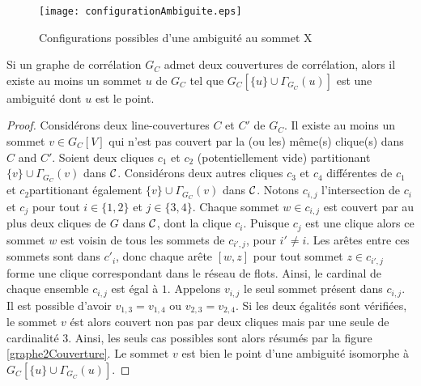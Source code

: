 	\begin{centering}\vspace{-0.5em}
	\begin{figure}[htb!]\vspace{-0.5em}
	\texttt{[image: configurationAmbiguite.eps]}\vspace{-0.5em}
	\caption{ Configurations possibles d'une ambiguit\'e au sommet X }\vspace{-0.5em}
	\label{configurationAmbiguite}
	\end{figure}
	\end{centering}
	
	\begin{lemma}
	Si un graphe de corr\'elation $G_C$ admet deux couvertures de corr\'elation, alors il existe au moins un sommet $u$ de $G_C$ tel que $G_{C}[\{u\} \cup \Gamma_{G_C}(u)]$ est une ambiguit\'e dont $u$ est le point.
	\end{lemma}
	
	\begin{proof} 
		Consid\'erons deux line-couvertures $C$ et $C'$ de $G_C$. 
		Il existe au moins un sommet $v \in G_C[V]$ qui n'est pas couvert par la (ou les) m\^eme(s) clique(s) dans $C$ and $C'$.
		Soient deux cliques $c_1$ et $c_2$ (potentiellement vide) partitionant $\{v\} \cup \Gamma_{G_C}(v)$ dans $\cal C$.
		Consid\'erons deux autres cliques $c_3$ et $c_4$ diff\'erentes de $c_1$ et $c_2$partitionant \'egalement $\{v\} \cup \Gamma_{G_C}(v)$ dans $\cal C$. \newline
		Notons $c_{i,j}$ l'intersection de $c_{i}$ et $c_j$ pour tout $i \in \{1,2\}$ et $j \in \{3,4\}$. 
		Chaque sommet $w \in c_{i,j}$ est couvert par au plus deux cliques de $G$ dans $\cal C$, dont la clique $c_i$.
		Puisque $c_j$ est une clique alors ce sommet $w$ est voisin de tous les sommets de  $c_{i',j}$, pour $i' \ne i$.
		Les ar\^etes entre ces sommets sont dans $c'_i$, donc chaque ar\^ete $[w,z]$ pour tout sommet  $z \in c_{i',j}$ forme une clique correspondant dans le r\'eseau de flots.
		Ainsi, le cardinal de chaque ensemble  $c_{i,j}$ est \'egal \`a $1$.\newline
		Appelons $v_{i,j}$ le seul sommet pr\'esent dans $c_{i,j}$. 
		Il est possible d'avoir $v_{1,3} = v_{1,4}$ ou $v_{2,3} = v_{2,4}$.
		Si les deux \'egalit\'es sont v\'erifi\'ees, le sommet $v$ \'est alors couvert non pas par deux cliques mais par une seule de cardinalit\'e $3$.
		Ainsi, les seuls cas possibles sont alors r\'esum\'es par la figure  \ref{graphe2Couverture}.
		Le sommet $v$ est bien le point d'une ambiguit\'e isomorphe \`a $G_C[\{u\} \cup \Gamma_{G_C}(u)]$.
	\end{proof}

